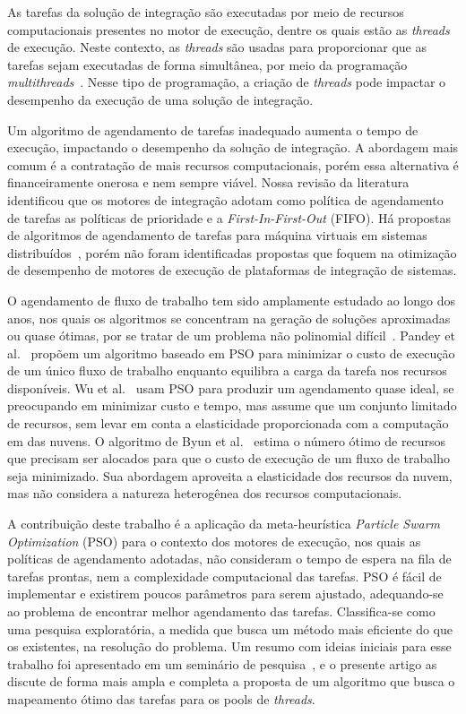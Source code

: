\documentclass[sigconf]{acmart}
\begin{document}
 As tarefas da solução de integração são executadas por meio de recursos computacionais presentes no motor de execução, dentre os quais estão as \emph{threads} de execução. Neste contexto, as \emph{threads} s\~{a}o usadas para proporcionar que as tarefas sejam executadas de forma simultânea, por meio da programação \emph{multithreads}~\cite{dietel2009,tanebaum2009}. Nesse tipo de programação, a criação de \emph{threads} pode impactar o desempenho da execução de uma solução de integração.
 
 Um algoritmo de agendamento de tarefas inadequado aumenta o tempo de execução, impactando o desempenho da solução de integração. A abordagem mais comum é a contratação de mais recursos computacionais, porém essa alternativa é financeiramente onerosa e nem sempre viável. Nossa revisão da literatura identificou que os motores de integração adotam como política de agendamento de tarefas as políticas de prioridade e a \textit{First-In-First-Out} (FIFO). Há propostas de algoritmos de agendamento de tarefas para máquina virtuais em sistemas distribuídos~\cite{rodriguez2014,al2015}, porém não foram identificadas propostas que foquem na otimização de desempenho de motores de execução de plataformas de integração de sistemas. 
 
 O agendamento de fluxo de trabalho tem sido amplamente estudado ao longo dos anos, nos quais os algoritmos se concentram na geração de soluções aproximadas ou quase ótimas, por se tratar de um problema não polinomial difícil~\cite{sousa2004}. Pandey et al.~\cite{pandey2010} propõem um algoritmo baseado em PSO para minimizar o custo de execução de um único fluxo de trabalho enquanto equilibra a carga da tarefa nos recursos disponíveis. Wu et al.~\cite{wu2010} usam PSO para produzir um agendamento quase ideal, se preocupando em minimizar custo e tempo, mas assume que um conjunto limitado de recursos, sem levar em conta a elasticidade proporcionada com a computação em das nuvens. O algoritmo de Byun et al.~\cite{byun2011} estima o número ótimo de recursos que precisam ser alocados para que o custo de execução de um fluxo de trabalho seja minimizado. Sua abordagem aproveita a elasticidade dos recursos da nuvem, mas não considera a natureza heterogênea dos recursos computacionais.
 
 A contribuição deste trabalho é a aplicação da meta-heurística \textit{Particle Swarm Optimization} (PSO) para o contexto dos motores de execução, nos quais as políticas de agendamento adotadas, não consideram o tempo de espera na fila de tarefas prontas, nem a complexidade computacional das tarefas. PSO é fácil de implementar e existirem poucos parâmetros para serem ajustado, adequando-se ao problema de encontrar melhor agendamento das tarefas. Classifica-se como uma pesquisa exploratória, a medida que busca um método mais eficiente do que os existentes, na resolução do problema. Um resumo com ideias iniciais para esse trabalho foi apresentado em um seminário de pesquisa~\cite{sellaro2017}, e o presente artigo as discute de forma mais ampla e completa  a proposta de um algoritmo que busca o mapeamento ótimo das tarefas para os pools de \emph{threads}.
 
\end{document}

